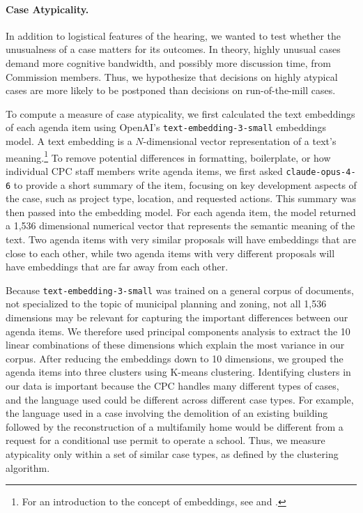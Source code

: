 \paragraph{Case Atypicality.} In addition to logistical features of the hearing, we wanted to test whether the unusualness of a case matters for its outcomes. In theory, highly unusual cases demand more cognitive bandwidth, and possibly more discussion time, from Commission members. Thus, we hypothesize that decisions on highly atypical cases are more likely to be postponed than decisions on run-of-the-mill cases. 

To compute a measure of case atypicality, we first calculated the text embeddings of each agenda item using OpenAI's \texttt{text-embedding-3-small} embeddings model. A text embedding is a $N$-dimensional vector representation of a text's meaning.\footnote{For an introduction to the concept of embeddings, see \citet{mikolov2013} and \citet{le2014}.} To remove potential differences in formatting, boilerplate, or how individual CPC staff members write agenda items, we first asked \texttt{claude-opus-4-6} to provide a short summary of the item, focusing on key development aspects of the case, such as project type, location, and requested actions. This summary was then passed into the embedding model. For each agenda item, the model returned a 1,536 dimensional numerical vector that represents the semantic meaning of the text. Two agenda items with very similar proposals will have embeddings that are close to each other, while two agenda items with very different proposals will have embeddings that are far away from each other. 

Because \texttt{text-embedding-3-small} was trained on a general corpus of documents, not specialized to the topic of municipal planning and zoning, not all 1,536 dimensions may be relevant for capturing the important differences between our agenda items. We therefore used principal components analysis to extract the 10 linear combinations of these dimensions which explain the most variance in our corpus. %
After reducing the embeddings down to 10 dimensions, we grouped the agenda items into three clusters using K-means clustering. Identifying clusters in our data is important because the CPC handles many different types of cases, and the language used could be different across different case types. For example, the language used in a case involving the demolition of an existing building followed by the reconstruction of a multifamily home would be different from a request for a conditional use permit to operate a school. Thus, we measure atypicality only within a set of similar case types, as defined by the clustering algorithm.

